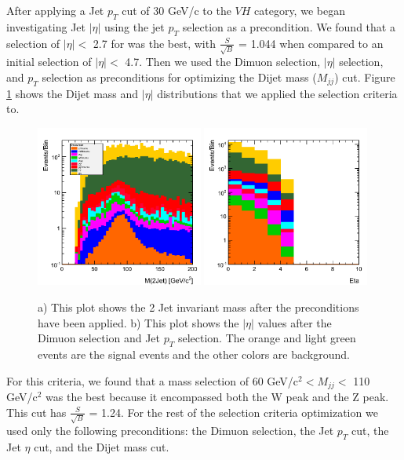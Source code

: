 \documentclass[12pt]{article}
\begin{document}
After applying a Jet $p_{T}$ cut of 30 GeV/c to the $VH$ category, we began investigating Jet $|\eta|$ using the jet $p_{T}$ selection as a precondition.  
We found that a selection of $|\eta|<$ 2.7 for was the best, with $\frac{S}{\sqrt{B}}$ = 1.044 when compared to an initial selection of $|\eta|<$ 4.7. 
Then we used the Dimuon selection, $|\eta|$ selection, and $p_{T}$ selection as preconditions for optimizing the Dijet mass ($M_{jj}$) cut. 
Figure \ref{fig:Mjj} shows the Dijet mass and $|\eta|$ distributions that we applied the selection criteria to.
\begin{figure}[!hbtp]
\begin{center}
    \includegraphics[width=0.49\textwidth]{images/Hist_jetMass.png}
    \includegraphics[width=0.49\textwidth]{images/Hist_jetEta.png}
    \caption{ \label{fig:Mjj}
         a) This plot shows the 2 Jet invariant mass after the preconditions have been applied. b) This plot shows the $|\eta|$
	 values after the Dimuon selection and Jet $p_{T}$ selection. The orange and light green events are the signal events and the other colors
	 are background.
      }
\end{center}
\end{figure}
For this criteria, we found that a mass selection of 60 GeV/c$^{2}< M_{jj}<$ 110 GeV/c$^{2}$ was the best
because it encompassed both the W peak and the Z peak. 
This cut has $\frac{S}{\sqrt{B}}$ = 1.24. For the rest of the selection criteria optimization we used only the following preconditions: 
the Dimuon selection, the Jet $p_{T}$ cut, the Jet $\eta$ cut, and the Dijet mass cut.
\end{document}
